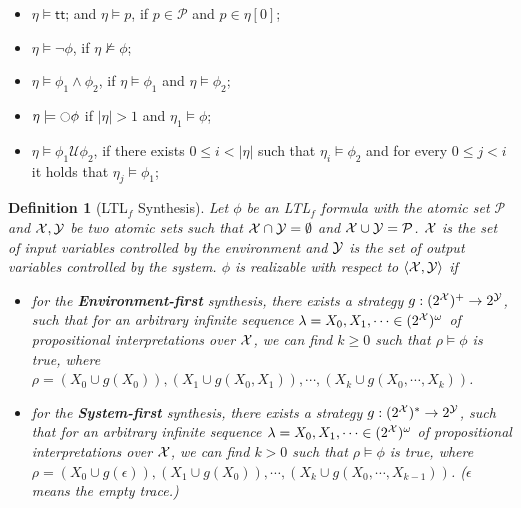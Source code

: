 \documentclass[letterpaper]{article} %
\newcommand{\U}{\mathcal{U}} \newcommand{\V}{\mathcal{V}} %
\newcommand{\ltlf}{\textsf{LTL}$_f$\xspace}
\newcommand{\true}{\textsf{tt}\xspace}
\newtheorem{definition}{Definition}
\begin{document}
\begin{itemize}%
  \item $\eta\models\true$; and $\eta\models p$, if $p\in\mathcal{P}$ and $p\in\eta[0]$;
  \item $\eta\models\neg\phi$, if $\eta\not\models\phi$;
  \item $\eta\models\phi_1\wedge\phi_2$,  if $\eta\models\phi_1$ and $\eta\models\phi_2$;
  \item $\eta\models \ocircle\phi$ if $|\eta|>1$ and $\eta_1\models\phi$;
  \item $\eta\models \phi_1 \U\phi_2$, if there exists $0\leq i < |\eta|$
  such that $\eta_i\models\phi_2$ and for every $0\leq j < i$ it holds that $\eta_j\models\phi_1$;
  \end{itemize}


\begin{definition}[\ltlf Synthesis]\label{def:synthesis}
Let $\phi$ be an \ltlf formula with the atomic set $\mathcal{P}$ and $\mathcal{X},\mathcal{Y}$ be two atomic sets such that $\mathcal{X}\cap \mathcal{Y}=\emptyset$ and $\mathcal{X}\cup \mathcal{Y}= \mathcal{P}$. $\mathcal{X}$ is the set of input variables controlled by the environment and $\mathcal{Y}$ is the set of output variables controlled by the system. $\phi$ is realizable with respect to $\langle \mathcal{X},\mathcal{Y}\rangle$ if
\begin{itemize}
\item for the \textbf{Environment-first} synthesis, there exists a strategy $g: (2^{\mathcal{X}})^+ \to 2^{\mathcal{Y}}$, such that for an arbitrary infinite sequence $\lambda = X_0, X_1, \cdots \in (2^{\mathcal{X}})^\omega$ of propositional interpretations over $\mathcal{X}$, we can find $k \geq 0$ such that $\rho\models\phi$ is true, where $\rho=(X_0\cup g(X_0)),(X_1\cup g(X_0,X_1)),\cdots,(X_k\cup g(X_0,\cdots,X_k))$.
\item for the \textbf{System-first} synthesis, there exists a strategy $g: (2^{\mathcal{X}})^* \to 2^{\mathcal{Y}}$, such that for an arbitrary infinite sequence $\lambda = X_0, X_1, \cdots \in (2^{\mathcal{X}})^\omega$ of propositional interpretations over $\mathcal{X}$, we can find $k > 0$ such that $\rho\models\phi$ is true, where $\rho=(X_0\cup g(\epsilon)),(X_1\cup g(X_0)),\cdots,(X_k\cup g(X_0,\cdots,X_{k-1}))$. ($\epsilon$ means the empty trace.) 
\end{itemize}
\end{definition}
\end{document}

